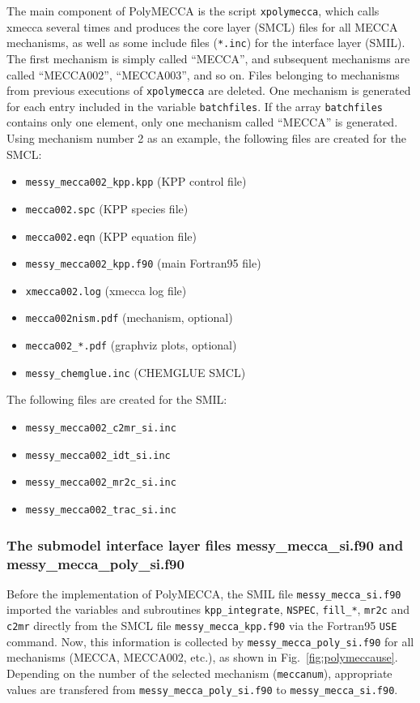 \documentclass[a4paper,twoside]{article}
\begin{document}
The main component of PolyMECCA is the script \verb|xpolymecca|, which
calls xmecca several times and produces the core layer (SMCL) files for
all MECCA mechanisms, as well as some include files (\verb|*.inc|) for
the interface layer (SMIL). The first mechanism is simply called
``MECCA'', and subsequent mechanisms are called ``MECCA002'',
``MECCA003'', and so on. Files belonging to mechanisms from previous
executions of \verb|xpolymecca| are deleted. One mechanism is generated
for each entry included in the variable \verb|batchfiles|. If the array
\verb|batchfiles| contains only one element, only one mechanism called
``MECCA'' is generated. Using mechanism number 2 as an example, the
following files are created for the SMCL:
\begin{itemize}
\item \verb|messy_mecca002_kpp.kpp| \hfill (KPP control file)
\item \verb|mecca002.spc|           \hfill (KPP species file)
\item \verb|mecca002.eqn|           \hfill (KPP equation file)
\item \verb|messy_mecca002_kpp.f90| \hfill (main Fortran95 file)
\item \verb|xmecca002.log|          \hfill (xmecca log file)
\item \verb|mecca002nism.pdf|       \hfill (mechanism, optional)
\item \verb|mecca002_*.pdf|         \hfill (graphviz plots, optional)
\item \verb|messy_chemglue.inc|     \hfill (CHEMGLUE SMCL)
\end{itemize}
The following files are created for the SMIL:
\begin{itemize}
\item \verb|messy_mecca002_c2mr_si.inc|
\item \verb|messy_mecca002_idt_si.inc|
\item \verb|messy_mecca002_mr2c_si.inc|
\item \verb|messy_mecca002_trac_si.inc|
\end{itemize}

\subsubsection{The submodel interface layer files messy\_mecca\_si.f90
  and messy\_mecca\_poly\_si.f90}

Before the implementation of PolyMECCA, the SMIL file
\verb|messy_mecca_si.f90| imported the variables and subroutines
\verb|kpp_integrate|, \verb|NSPEC|, \verb|fill_*|, \verb|mr2c| and
\verb|c2mr| directly from the SMCL file \verb|messy_mecca_kpp.f90| via
the Fortran95 \verb|USE| command. Now, this information is collected by
\verb|messy_mecca_poly_si.f90| for all mechanisms (MECCA, MECCA002,
etc.), as shown in Fig.~\ref{fig:polymeccause}. Depending on the number
of the selected mechanism (\verb|meccanum|), appropriate values are
transfered from \verb|messy_mecca_poly_si.f90| to
\verb|messy_mecca_si.f90|.
\end{document}
